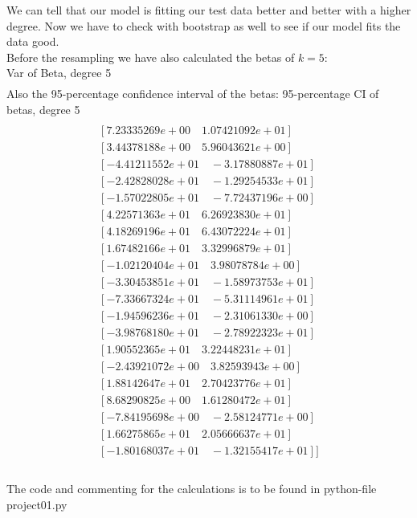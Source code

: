 \documentclass[a4paper,norsk]{article}
\begin{document}
We can tell that our model is fitting our test data better and better with a higher degree. Now we have to check with bootstrap as well to see if our model fits the data good.
\\Before the resampling we have also calculated the betas of $k=5$:
\\Var of Beta, degree 5
\begin{align*}
[9.47238055e-03\quad 8.01217226e-01 \quad4.12183842e-01\quad 9.89887798e+00\\
8.39455751e+00\quad 4.14211294e+00\quad 2.71771303e+01\quad 3.28888083e+01\\
1.78285914e+01\quad 1.31093669e+01\quad 1.91368860e+01\quad 2.67004422e+01\\
1.91391193e+01\quad 9.34737951e+00\quad 1.13215581e+01\quad 2.55450522e+00\\
4.40599813e+00\quad 3.60735967e+00\quad 1.80107762e+00\quad 1.00979408e+00\\
1.50021893e+00]
\end{align*}
Also the 95-percentage confidence interval of the betas:
95-percentage CI of betas, degree 5
\begin{align*}
[[ 7.25873511e-02\quad  4.54098870e-01]\\
[ 7.23335269e+00\quad  1.07421092e+01]\\
[ 3.44378188e+00 \quad 5.96043621e+00]\\
[-4.41211552e+01\quad -3.17880887e+01]\\
[-2.42828028e+01\quad -1.29254533e+01]\\
[-1.57022805e+01\quad -7.72437196e+00]\\
[ 4.22571363e+01\quad  6.26923830e+01]\\
[ 4.18269196e+01\quad  6.43072224e+01]\\
[ 1.67482166e+01\quad  3.32996879e+01]\\
[-1.02120404e+01\quad  3.98078784e+00]\\
[-3.30453851e+01\quad -1.58973753e+01]\\
[-7.33667324e+01\quad -5.31114961e+01]\\
[-1.94596236e+01\quad -2.31061330e+00]\\
[-3.98768180e+01\quad -2.78922323e+01]\\
[ 1.90552365e+01\quad  3.22448231e+01]\\
[-2.43921072e+00\quad  3.82593943e+00]\\
[ 1.88142647e+01\quad  2.70423776e+01]\\
[ 8.68290825e+00\quad  1.61280472e+01]\\
[-7.84195698e+00\quad -2.58124771e+00]\\
[ 1.66275865e+01\quad  2.05666637e+01]\\
[-1.80168037e+01\quad -1.32155417e+01]]\\
\end{align*}
\\ The code and commenting for the calculations is to be found in python-file project01.py
\end{document}
